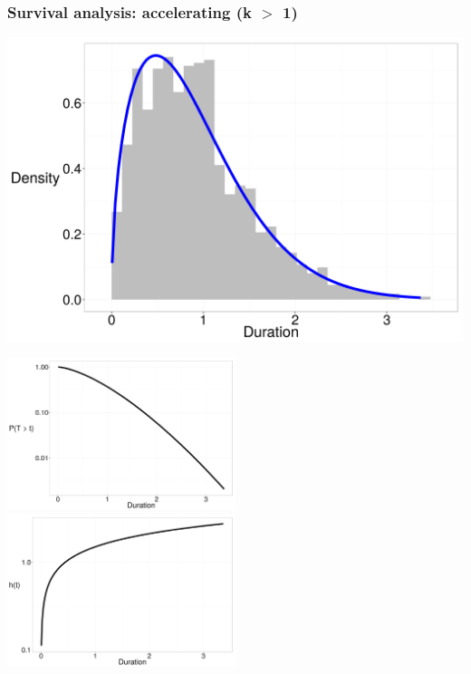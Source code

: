 \documentclass{beamer}
\begin{document}
\begin{frame}
  \frametitle{Survival analysis: accelerating (k \(>\) 1)}

  \begin{center}
    \includegraphics[height = 0.4\textheight, width = \textwidth, keepaspectratio = true]{figure/dur_acc}

    \includegraphics[height = 0.6\textheight, width = 0.5\textwidth, keepaspectratio = true]{figure/sur_acc}
    \includegraphics[height = 0.6\textheight, width = 0.5\textwidth, keepaspectratio = true]{figure/haz_acc}
  \end{center}
\end{frame}
\end{document}
